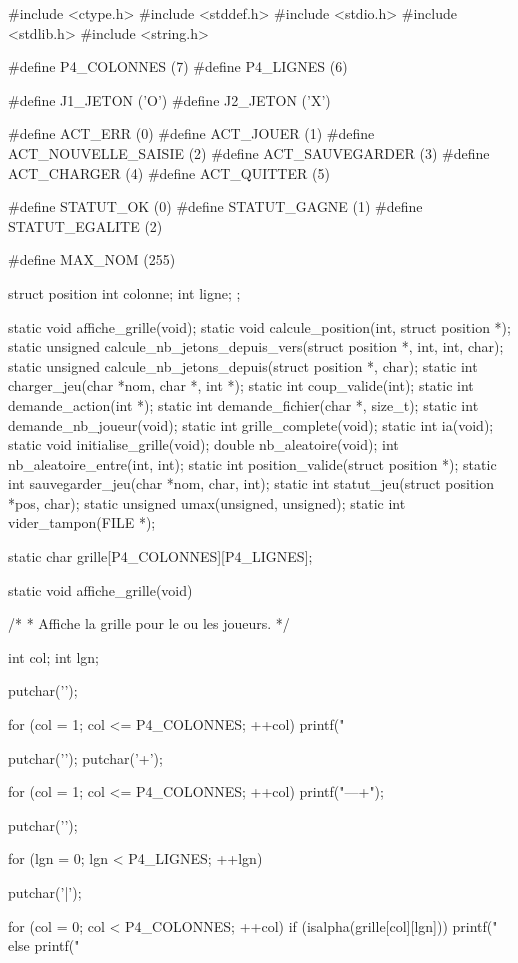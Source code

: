 \begin{C}
#include <ctype.h>
#include <stddef.h>
#include <stdio.h>
#include <stdlib.h>
#include <string.h>

#define P4_COLONNES (7)
#define P4_LIGNES (6)

#define J1_JETON ('O')
#define J2_JETON ('X')

#define ACT_ERR (0)
#define ACT_JOUER (1)
#define ACT_NOUVELLE_SAISIE (2)
#define ACT_SAUVEGARDER (3)
#define ACT_CHARGER (4)
#define ACT_QUITTER (5)

#define STATUT_OK (0)
#define STATUT_GAGNE (1)
#define STATUT_EGALITE (2)

#define MAX_NOM (255)

struct position
{
    int colonne;
    int ligne;
};

static void affiche_grille(void);
static void calcule_position(int, struct position *);
static unsigned calcule_nb_jetons_depuis_vers(struct position *, int, int, char);
static unsigned calcule_nb_jetons_depuis(struct position *, char);
static int charger_jeu(char *nom, char *, int *);
static int coup_valide(int);
static int demande_action(int *);
static int demande_fichier(char *, size_t);
static int demande_nb_joueur(void);
static int grille_complete(void);
static int ia(void);
static void initialise_grille(void);
double nb_aleatoire(void);
int nb_aleatoire_entre(int, int);
static int position_valide(struct position *);
static int sauvegarder_jeu(char *nom, char, int);
static int statut_jeu(struct position *pos, char);
static unsigned umax(unsigned, unsigned);
static int vider_tampon(FILE *);

static char grille[P4_COLONNES][P4_LIGNES];


static void affiche_grille(void)
{
    /*
     * Affiche la grille pour le ou les joueurs.
     */

    int col;
    int lgn;

    putchar('\n');

    for (col = 1; col <= P4_COLONNES; ++col)
        printf("  %

    putchar('\n');
    putchar('+');

    for (col = 1; col <= P4_COLONNES; ++col)
        printf("---+");

    putchar('\n');

    for (lgn = 0; lgn < P4_LIGNES; ++lgn)
    {
        putchar('|');

        for (col = 0; col < P4_COLONNES; ++col)
            if (isalpha(grille[col][lgn]))
                printf(" %
            else
                printf(" %

}}
\end{C}
